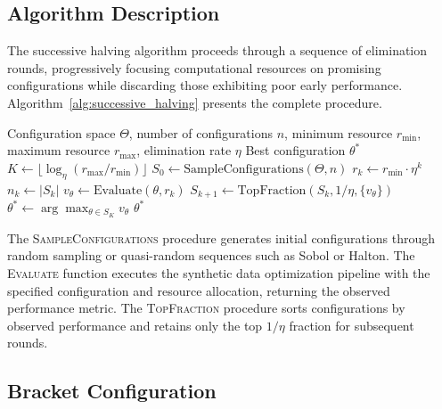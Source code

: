 \subsection{Algorithm Description}

The successive halving algorithm proceeds through a sequence of elimination rounds, progressively focusing computational resources on promising configurations while discarding those exhibiting poor early performance. Algorithm~\ref{alg:successive_halving} presents the complete procedure.

\begin{algorithm}[htbp]
\caption{Successive Halving for Multi-Fidelity Optimization}
\label{alg:successive_halving}
\begin{algorithmic}[1]
\Require Configuration space $\Theta$, number of configurations $n$, minimum resource $r_{\min}$, maximum resource $r_{\max}$, elimination rate $\eta$
\Ensure Best configuration $\theta^*$
\State $K \gets \lfloor \log_\eta(r_{\max}/r_{\min}) \rfloor$ 
\State $S_0 \gets \text{SampleConfigurations}(\Theta, n)$ 
    \State $r_k \gets r_{\min} \cdot \eta^k$ 
    \State $n_k \gets |S_k|$ 
        \State $v_\theta \gets \text{Evaluate}(\theta, r_k)$ 
    \EndFor
    \State $S_{k+1} \gets \text{TopFraction}(S_k, 1/\eta, \{v_\theta\})$ 
\EndFor
\State $\theta^* \gets \arg\max_{\theta \in S_K} v_\theta$ 
\State \Return $\theta^*$
\end{algorithmic}
\end{algorithm}

The \textsc{SampleConfigurations} procedure generates initial configurations through random sampling or quasi-random sequences such as Sobol or Halton. The \textsc{Evaluate} function executes the synthetic data optimization pipeline with the specified configuration and resource allocation, returning the observed performance metric. The \textsc{TopFraction} procedure sorts configurations by observed performance and retains only the top $1/\eta$ fraction for subsequent rounds.

\subsection{Bracket Configuration}

